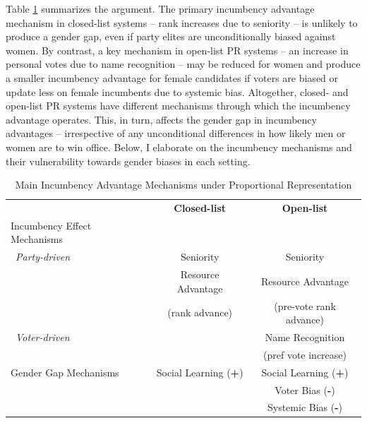 \documentclass[12pt]{article}
\begin{document}
Table \ref{tab:inc_mechanisms} summarizes the argument. The primary incumbency advantage mechanism in closed-list systems -- rank increases due to seniority -- is unlikely to produce a gender gap, even if party elites are unconditionally biased against women. By contrast, a key mechanism in open-list PR systems -- an increase in personal votes due to name recognition -- may be reduced for women and produce a smaller incumbency advantage for female candidates if voters are biased or update less on female incumbents due to systemic bias. Altogether, closed- and open-list PR systems have different mechanisms through which the incumbency advantage operates. This, in turn, affects the gender gap in incumbency advantages -- irrespective of any unconditional differences in how likely men or women are to win office. Below, I elaborate on the incumbency mechanisms and their vulnerability towards gender biases in each setting.

\begin{table}[thbp]
    \centering\begin{tabular}{lcc}
        \toprule
         & \textbf{Closed-list} & \textbf{Open-list} \\
        \cmidrule(lr){1-3}
        Incumbency Effect Mechanisms & & \\
        \, \emph{Party-driven} &  Seniority  & Seniority \\
        & Resource Advantage & Resource Advantage \\
        & (rank advance) & (pre-vote rank advance) \\[2mm]
        \, \emph{Voter-driven}  &                          & Name Recognition  \\
                  & & (pref vote increase) \\[2mm]
       Gender Gap Mechanisms & Social Learning (\textbf{+}) & Social Learning (\textbf{+}) \\
                   & & Voter Bias (\textbf{-}) \\
                   & & Systemic Bias (\textbf{-}) \\
    \bottomrule
    \end{tabular}
    \caption{Main Incumbency Advantage Mechanisms under Proportional Representation}
    \label{tab:inc_mechanisms}
\end{table}
\end{document}
